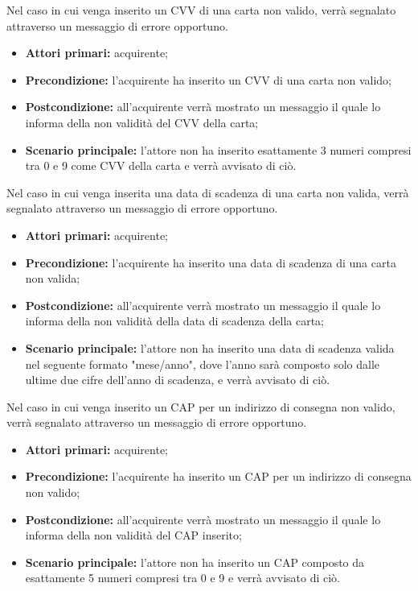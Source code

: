 Nel caso in cui venga inserito un CVV di una carta non valido, verrà segnalato attraverso un messaggio di errore opportuno.
\begin{itemize}
	\item \textbf{Attori primari:} acquirente;
	\item \textbf{Precondizione:} l'acquirente ha inserito un CVV di una carta non valido;
	\item \textbf{Postcondizione:} all'acquirente verrà mostrato un messaggio il quale lo informa della non validità del CVV della carta;
	\item \textbf{Scenario principale:} l'attore non ha inserito esattamente 3 numeri compresi tra 0 e 9 come CVV della carta e verrà avvisato di ciò.
\end{itemize}

Nel caso in cui venga inserita una data di scadenza di una carta non valida, verrà segnalato attraverso un messaggio di errore opportuno.
\begin{itemize}
	\item \textbf{Attori primari:} acquirente;
	\item \textbf{Precondizione:} l'acquirente ha inserito una data di scadenza di una carta non valida;
	\item \textbf{Postcondizione:} all'acquirente verrà mostrato un messaggio il quale lo informa della non validità della data di scadenza della carta;
	\item \textbf{Scenario principale:} l'attore non ha inserito una data di scadenza valida nel seguente formato "mese/anno", dove l'anno sarà composto solo dalle ultime due cifre dell'anno di scadenza, e verrà avvisato di ciò.
\end{itemize}

Nel caso in cui venga inserito un CAP per un indirizzo di consegna non valido, verrà segnalato attraverso un messaggio di errore opportuno.
\begin{itemize}
	\item \textbf{Attori primari:} acquirente;
	\item \textbf{Precondizione:} l'acquirente ha inserito un CAP per un indirizzo di consegna non valido;
	\item \textbf{Postcondizione:} all'acquirente verrà mostrato un messaggio il quale lo informa della non validità del CAP inserito;
	\item \textbf{Scenario principale:} l'attore non ha inserito un CAP composto da esattamente 5 numeri compresi tra 0 e 9 e verrà avvisato di ciò.
\end{itemize}

